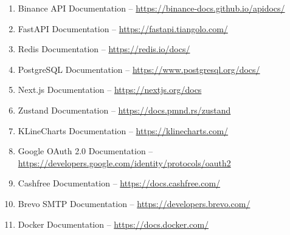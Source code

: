 \begin{enumerate}
\item Binance API Documentation -- \url{https://binance-docs.github.io/apidocs/}
\item FastAPI Documentation -- \url{https://fastapi.tiangolo.com/}
\item Redis Documentation -- \url{https://redis.io/docs/}
\item PostgreSQL Documentation -- \url{https://www.postgresql.org/docs/}
\item Next.js Documentation -- \url{https://nextjs.org/docs}
\item Zustand Documentation -- \url{https://docs.pmnd.rs/zustand}
\item KLineCharts Documentation -- \url{https://klinecharts.com/}
\item Google OAuth 2.0 Documentation -- \url{https://developers.google.com/identity/protocols/oauth2}
\item Cashfree Documentation -- \url{https://docs.cashfree.com/}
\item Brevo SMTP Documentation -- \url{https://developers.brevo.com/}
\item Docker Documentation -- \url{https://docs.docker.com/}
\end{enumerate}


